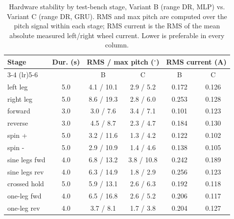 \begin{table}[H]
\caption{Hardware stability by test-bench stage, Variant B (range DR, MLP) vs. Variant C (range DR, GRU). RMS and max pitch are computed over the pitch signal within each stage; RMS current is the RMS of the mean absolute measured left/right wheel current. Lower is preferable in every column.}
\begin{tabularx}{\textwidth}{Xccccc}
\toprule
\multirow{2}{*}{Stage} & \multirow{2}{*}{Dur. (s)} & \multicolumn{2}{c}{RMS / max pitch ($^\circ$)} & \multicolumn{2}{c}{RMS current (A)} \\
\cmidrule(lr){3-4} \cmidrule(lr){5-6}
 & & B & C & B & C \\
\midrule
left leg & 5.0 & 4.1 / 10.1 & 2.9 / 5.2 & 0.172 & 0.126 \\
right leg & 5.0 & 8.6 / 19.3 & 2.8 / 6.0 & 0.253 & 0.128 \\
forward & 3.0 & 3.0 / 7.6 & 3.4 / 7.1 & 0.101 & 0.123 \\
reverse & 3.0 & 4.5 / 8.7 & 2.3 / 4.7 & 0.184 & 0.130 \\
spin + & 5.0 & 3.2 / 11.6 & 1.3 / 4.2 & 0.122 & 0.102 \\
spin - & 5.0 & 2.9 / 10.9 & 1.4 / 4.6 & 0.138 & 0.105 \\
sine legs fwd & 4.0 & 6.8 / 13.2 & 3.8 / 10.8 & 0.242 & 0.189 \\
sine legs rev & 4.0 & 6.3 / 14.9 & 1.8 / 2.9 & 0.256 & 0.123 \\
crossed hold & 5.0 & 5.9 / 13.1 & 2.6 / 6.3 & 0.192 & 0.118 \\
one-leg fwd & 4.0 & 6.5 / 16.8 & 2.6 / 5.2 & 0.206 & 0.117 \\
one-leg rev & 4.0 & 3.7 / 8.1 & 1.7 / 3.8 & 0.204 & 0.127 \\
\bottomrule
\end{tabularx}
\label{tab:hw-stability-by-stage}
\end{table}
